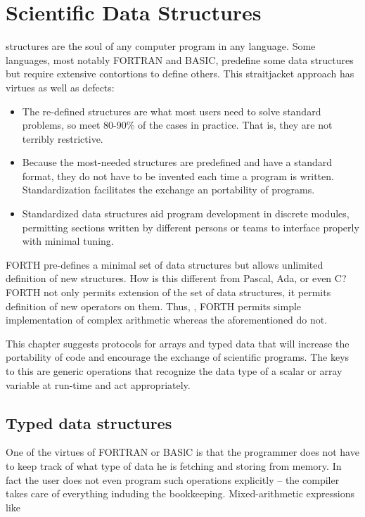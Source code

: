 
\chapter{Scientific Data Structures}

 structures are the soul of any computer program in any language. Some languages, most notably FORTRAN and BASIC, predefine some data structures but require extensive contortions to define others. This straitjacket approach has virtues as well as defects:

\begin{itemize}
    \item The re-defined structures are what most users need to solve standard problems, so meet 80-90\% of the cases in practice. That is, they are not terribly restrictive.
    \item Because the most-needed structures are predefined and have a standard format, they do not have to be invented each time a program is written. Standardization facilitates the exchange an portability of programs.
    \item Standardized data structures aid program development in discrete modules, permitting sections written by different persons or teams to interface properly with minimal tuning.
\end{itemize}

FORTH pre-defines a minimal set of data structures but allows unlimited definition of new structures. How is this different from Pascal, Ada, or even C? FORTH not only permits extension of the set of data structures, it permits definition of new operators on them. Thus, \eg, FORTH permits simple implementation of complex arithmetic whereas the aforementioned do not.

This chapter suggests protocols for arrays and typed data that will increase the portability of code and encourage the exchange of scientific programs. The keys to this are generic operations that recognize the data type of a scalar or array variable at run-time and act appropriately.

\section{Typed data structures}

One of the virtues of FORTRAN or BASlC is that the programmer does not have to keep track of what type of data he is fetching and storing from memory. In fact the user does not even program such operations explicitly -- the compiler takes care of everything induding the bookkeeping. Mixed-arithmetic expressions like

